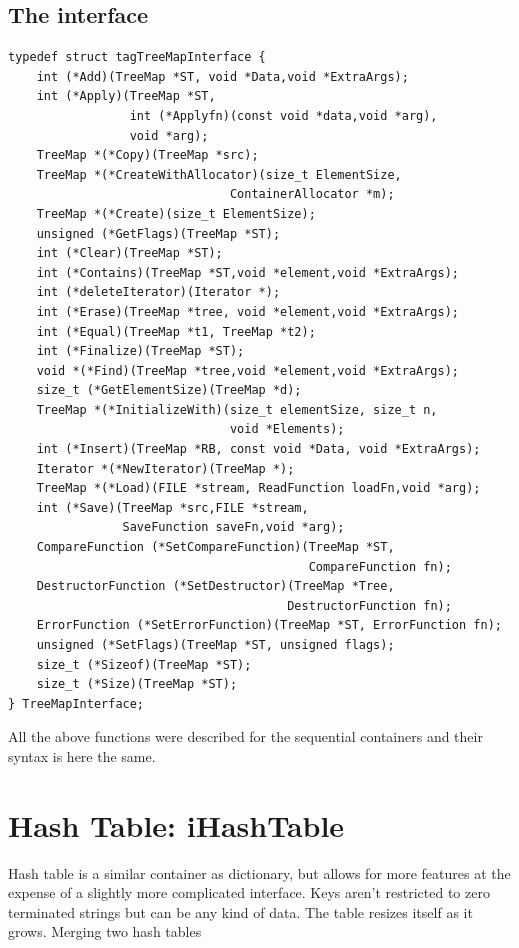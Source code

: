 \documentclass[12pt,a4paper]{memoir} %
\newcommand{\container}{}
\begin{document}
{{\subsection{The interface}
\begin{verbatim}
typedef struct tagTreeMapInterface {
    int (*Add)(TreeMap *ST, void *Data,void *ExtraArgs); 
    int (*Apply)(TreeMap *ST,
                 int (*Applyfn)(const void *data,void *arg),
                 void *arg);
    TreeMap *(*Copy)(TreeMap *src);
    TreeMap *(*CreateWithAllocator)(size_t ElementSize,
                               ContainerAllocator *m);
    TreeMap *(*Create)(size_t ElementSize);
    unsigned (*GetFlags)(TreeMap *ST);
    int (*Clear)(TreeMap *ST); 
    int (*Contains)(TreeMap *ST,void *element,void *ExtraArgs);
    int (*deleteIterator)(Iterator *);
    int (*Erase)(TreeMap *tree, void *element,void *ExtraArgs);  
    int (*Equal)(TreeMap *t1, TreeMap *t2);
    int (*Finalize)(TreeMap *ST);  
    void *(*Find)(TreeMap *tree,void *element,void *ExtraArgs);
    size_t (*GetElementSize)(TreeMap *d);
    TreeMap *(*InitializeWith)(size_t elementSize, size_t n,
                               void *Elements);
    int (*Insert)(TreeMap *RB, const void *Data, void *ExtraArgs);
    Iterator *(*NewIterator)(TreeMap *);
    TreeMap *(*Load)(FILE *stream, ReadFunction loadFn,void *arg);
    int (*Save)(TreeMap *src,FILE *stream, 
                SaveFunction saveFn,void *arg);
    CompareFunction (*SetCompareFunction)(TreeMap *ST,
                                          CompareFunction fn);
    DestructorFunction (*SetDestructor)(TreeMap *Tree,
                                       DestructorFunction fn);
    ErrorFunction (*SetErrorFunction)(TreeMap *ST, ErrorFunction fn);
    unsigned (*SetFlags)(TreeMap *ST, unsigned flags); 
    size_t (*Sizeof)(TreeMap *ST);
    size_t (*Size)(TreeMap *ST);  
} TreeMapInterface;
\end{verbatim}
All the above functions were described for the sequential containers and their syntax is here the same.
\newpage
\section{Hash Table: iHashTable}
\renewcommand{\container}{HashTable}
Hash table is a similar container as dictionary, but allows for more features at the expense of a slightly more complicated interface. 
Keys aren't restricted to zero terminated strings but can be any kind of data. 
The table resizes itself as it grows.
Merging two hash tables

}}
\end{document}
